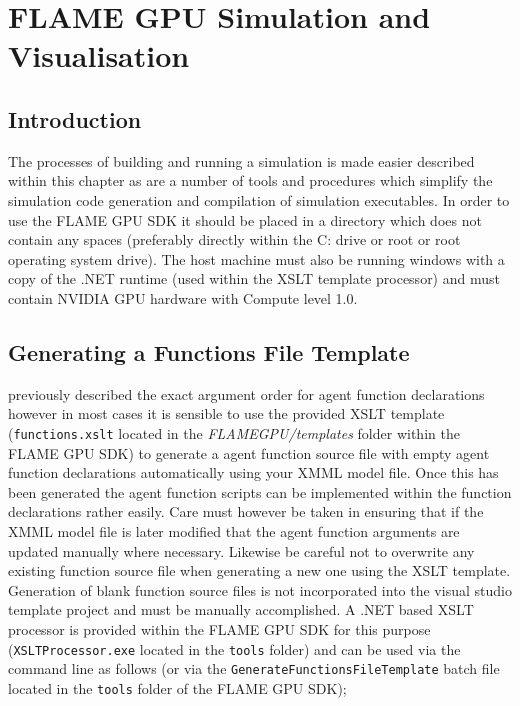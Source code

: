\documentclass[11pt, a4paper, onecolumn, oneside]{report}
\begin{document}
\chapter{FLAME GPU Simulation and Visualisation}
\label{ch:4}
\section{Introduction}
\label{sec:41}


The processes of building and running a simulation is made easier described within this chapter as are a number of tools and procedures which simplify the simulation code generation and compilation of simulation executables.
In order to use the FLAME GPU SDK it should be placed in a directory which does not contain any spaces (preferably directly within the C: drive or root or root operating system drive).
The host machine must also be running windows with a copy of the .NET runtime (used within the XSLT template processor) and must contain NVIDIA GPU hardware with Compute level 1.0.

\section{Generating a Functions File Template}
\label{sec:42}


 previously described the exact argument order for agent function declarations however in most cases it is sensible to use the provided XSLT template (\texttt{functions.xslt} located in the \emph{FLAMEGPU/templates} folder within the FLAME GPU SDK) to generate a agent function source file with empty agent function declarations automatically using your XMML model file.
Once this has been generated the agent function scripts can be implemented within the function declarations rather easily.
Care must however be taken in ensuring that if the XMML model file is later modified that the agent function arguments are updated manually where necessary.
Likewise be careful not to overwrite any existing function source file when generating a new one using the XSLT template.
Generation of blank function source files is not incorporated into the visual studio template project and must be manually accomplished.
A .NET based XSLT processor is provided within the FLAME GPU SDK for this purpose (\texttt{XSLTProcessor.exe} located in the \texttt{tools} folder) and can be used via the command line as follows (or via the \texttt{GenerateFunctionsFileTemplate} batch file located in the \texttt{tools} folder of the FLAME GPU SDK);
\end{document}
